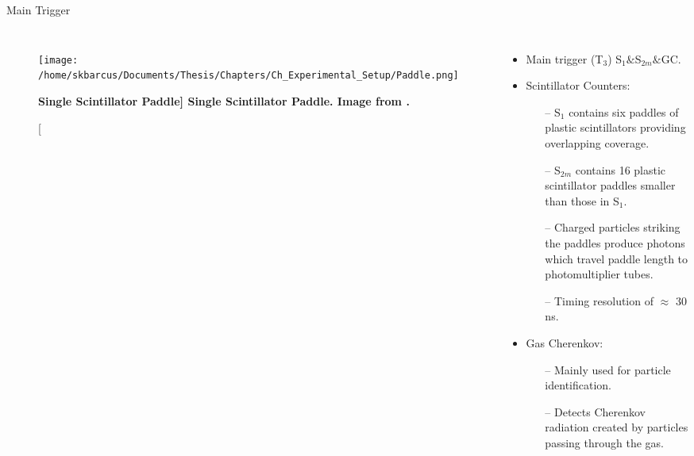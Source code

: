 \documentclass[10pt]{beamer}
\begin{document}
\begin{frame}[fragile]{Main Trigger}

	\begin{columns}[T,onlytextwidth]  
	
	\begin{figure}[!ht]
	\begin{center}
	\texttt{[image: /home/skbarcus/Documents/Thesis/Chapters/Ch\_Experimental\_Setup/Paddle.png]}
	\end{center}
	\caption[\bf{Single Scintillator Paddle}]{
	{\bf{Single Scintillator Paddle.}} Image from \cite{Thesis:Wang}.}
	\label{fig:halla_top}
	\end{figure}	
	
	\begin{itemize}
		\item \alert{Main trigger (T$_3$) S$_1$$\&$S$_{2m}$$\&$GC}.
		\pause
		\item \alert{Scintillator Counters}:
			\begin{itemize}
				\item[--] S$_1$ contains six paddles of plastic scintillators providing overlapping coverage.
				\item[--] S$_{2m}$ contains 16 plastic scintillator paddles smaller than those in S$_1$.
				\item[--] Charged particles striking the paddles produce photons which travel paddle length to photomultiplier tubes.
				\item[--] \alert{Timing resolution of $\approx$ 30 ns}.
			\end{itemize}
		\pause
		\item \alert{Gas Cherenkov}:
			\begin{itemize}
				\item[--] Mainly used for \alert{particle identification}.
				\item[--] Detects Cherenkov radiation created by particles passing through the gas.
			\end{itemize}
	\end{itemize}
	

	\end{columns}
	
\end{frame}
\end{document}
